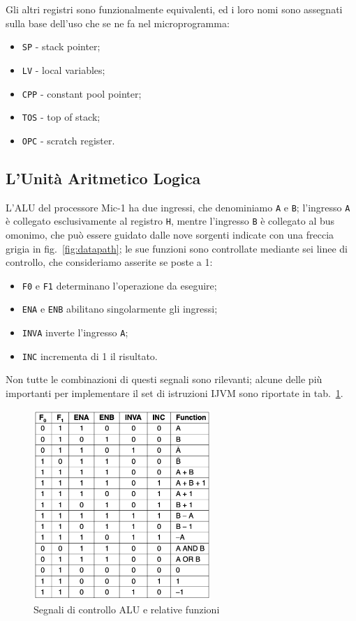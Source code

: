 \documentclass[a4paper,12pt]{scrreprt}
\begin{document}
Gli altri registri sono funzionalmente equivalenti, ed i loro nomi sono
assegnati sulla base dell'uso che se ne fa nel microprogramma:
\begin{itemize}
  \item \lstinline{SP} - stack pointer;
  \item \lstinline{LV} - local variables;
  \item \lstinline{CPP} - constant pool pointer;
  \item \lstinline{TOS} - top of stack;
  \item \lstinline{OPC} - scratch register.
\end{itemize}

\subsection{L'Unità Aritmetico Logica}

L'ALU del processore Mic-1 ha due ingressi, che denominiamo \lstinline{A} e
\lstinline{B}; l'ingresso \lstinline{A} è collegato esclusivamente al registro
\lstinline{H}, mentre l'ingresso \lstinline{B} è collegato al bus
omonimo, che può essere guidato dalle nove sorgenti indicate con una freccia
grigia in fig.~\ref{fig:datapath}; le sue funzioni sono controllate mediante sei
linee di controllo, che consideriamo asserite se poste a 1:
\begin{itemize}
  \item \lstinline{F0} e \lstinline{F1} determinano l'operazione da eseguire;
  \item \lstinline{ENA} e \lstinline{ENB} abilitano singolarmente gli ingressi;
  \item \lstinline{INVA} inverte l'ingresso \lstinline{A};
  \item \lstinline{INC} incrementa di 1 il risultato.
\end{itemize}

Non tutte le combinazioni di questi segnali sono rilevanti; alcune delle più
importanti per implementare il set di istruzioni IJVM sono riportate in
tab.~\ref{fig:alu_func}.

\begin{figure}
  \centering
  \includegraphics[width=0.6\textwidth]{alu_func.png}
  \caption{Segnali di controllo ALU e relative funzioni}\label{fig:alu_func}
\end{figure}
\end{document}
